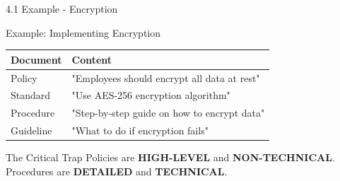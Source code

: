 \documentclass[10pt]{beamer}  %
\begin{document}
	\begin{frame}{4.1 Example - Encryption}
		\begin{block}{Example: Implementing Encryption}
			\begin{tabular}{|p{2.5cm}|p{8.5cm}|}
				\hline
				\textbf{Document} & \textbf{Content} \\
				\hline
				Policy & "Employees should encrypt all data at rest" \\
				\hline
				Standard & "Use AES-256 encryption algorithm" \\
				\hline
				Procedure & "Step-by-step guide on how to encrypt data" \\
				\hline
				Guideline & "What to do if encryption fails" \\
				\hline
			\end{tabular}
		\end{block}
		
		\begin{alertblock}{The Critical Trap}
			Policies are \textbf{HIGH-LEVEL} and \textbf{NON-TECHNICAL}. \\
			Procedures are \textbf{DETAILED} and \textbf{TECHNICAL}.
		\end{alertblock}
	\end{frame}
	
\end{document}
